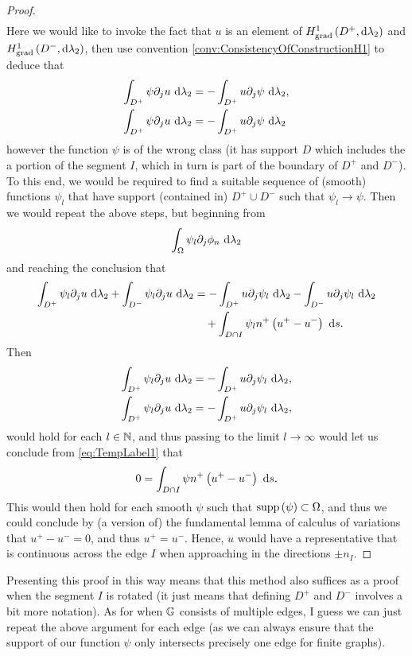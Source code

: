 \documentclass[11pt]{report}
\begin{document}
\begin{proof}
\begin{align*}
	\end{align*}
	Here we would like to invoke the fact that $u$ is an element of $H^1_\mathrm{grad}\left( D^+, \mathrm{d}\lambda_2 \right)$ and $H^1_\mathrm{grad}\left( D^-, \mathrm{d}\lambda_2 \right)$, then use convention \ref{conv:ConsistencyOfConstructionH1} to deduce that
	\begin{align*}
		\int_{D^+}\psi\partial_j u \ \mathrm{d}\lambda_2 &= -\int_{D^+}u\partial_j\psi \ \mathrm{d}\lambda_2, \\
		\int_{D^+}\psi\partial_j u \ \mathrm{d}\lambda_2 &= -\int_{D^+}u\partial_j\psi \ \mathrm{d}\lambda_2
	\end{align*}
	however the function $\psi$ is of the wrong class (it has support $D$ which includes the a portion of the segment $I$, which in turn is part of the boundary of $D^+$ and $D^-$).
	To this end, we would be required to find a suitable sequence of (smooth) functions $\psi_l$ that have support (contained in) $D^+ \cup D^-$ such that $\psi_l\rightarrow\psi$.
	Then we would repeat the above steps, but beginning from
	\begin{align*}
		\int_{\Omega}\psi_l\partial_j\phi_n \ \mathrm{d}\lambda_2
	\end{align*}
	and reaching the conclusion that
	\begin{align} \label{eq:TempLabel1}
		\int_{D^+}\psi_l\partial_j u \ \mathrm{d}\lambda_2 + \int_{D^-}\psi_l\partial_j u \ \mathrm{d}\lambda_2
		&= -\int_{D^+}u\partial_j\psi_l \ \mathrm{d}\lambda_2 -\int_{D^-}u\partial_j\psi_l \ \mathrm{d}\lambda_2 \\
		&\quad + \int_{D \cap I}\psi_l n^+\left( u^{+} - u^{-} \right) \ \mathrm{d}s.
	\end{align}
	Then
	\begin{align*}
		\int_{D^+}\psi_l\partial_j u \ \mathrm{d}\lambda_2 &= -\int_{D^+}u\partial_j\psi_l \ \mathrm{d}\lambda_2, \\
		\int_{D^+}\psi_l\partial_j u \ \mathrm{d}\lambda_2 &= -\int_{D^+}u\partial_j\psi_l \ \mathrm{d}\lambda_2,
	\end{align*}
	would hold for each $l\in\mathbb{N}$, and thus passing to the limit $l\rightarrow\infty$ would let us conclude from \eqref{eq:TempLabel1} that
	\begin{align*}
		0 = \int_{D \cap I}\psi n^+\left( u^{+} - u^{-} \right) \ \mathrm{d}s.
	\end{align*}
	This would then hold for each smooth $\psi$ such that $\mathrm{supp}\left( \psi \right)\subset\Omega$, and thus we could conclude by (a version of) the fundamental lemma of calculus of variations that $u^{+} - u^{-}=0$, and thus $u^+ = u^-$.
	Hence, $u$ would have a representative that is continuous across the edge $I$ when approaching in the directions $\pm n_I$.
\end{proof}

Presenting this proof in this way means that this method also suffices as a proof when the segment $I$ is rotated (it just means that defining $D^+$ and $D^-$ involves a bit more notation).
As for when $\mathbb{G}$ consists of multiple edges, I guess we can just repeat the above argument for each edge (as we can always ensure that the support of our function $\psi$ only intersects precisely one edge for finite graphs).
\end{document}

